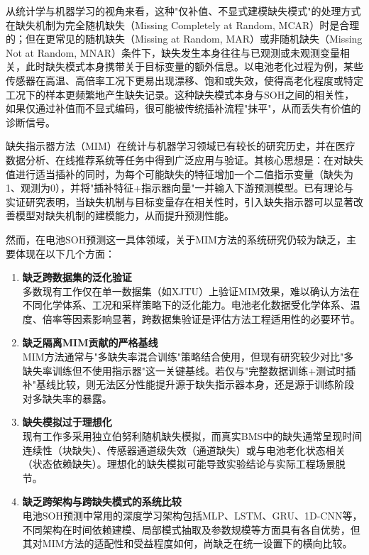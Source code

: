 \documentclass[10pt,a4paper]{ctexart}
\begin{document}
从统计学与机器学习的视角来看，这种"仅补值、不显式建模缺失模式"的处理方式在缺失机制为完全随机缺失（Missing Completely at Random, MCAR）时是合理的；但在更常见的随机缺失（Missing at Random, MAR）或非随机缺失（Missing Not at Random, MNAR）条件下，缺失发生本身往往与已观测或未观测变量相关，此时缺失模式本身携带关于目标变量的额外信息。以电池老化过程为例，某些传感器在高温、高倍率工况下更易出现漂移、饱和或失效，使得高老化程度或特定工况下的样本更频繁地产生缺失记录。这种缺失模式本身与SOH之间的相关性，如果仅通过补值而不显式编码，很可能被传统插补流程"抹平"，从而丢失有价值的诊断信号。

缺失指示器方法（MIM）在统计与机器学习领域已有较长的研究历史，并在医疗数据分析、在线推荐系统等任务中得到广泛应用与验证\cite{jones1996indicator,van2023missing}。其核心思想是：在对缺失值进行适当插补的同时，为每个可能缺失的特征增加一个二值指示变量（缺失为1、观测为0），并将"插补特征+指示器向量"一并输入下游预测模型。已有理论与实证研究表明，当缺失机制与目标变量存在相关性时，引入缺失指示器可以显著改善模型对缺失机制的建模能力，从而提升预测性能\cite{sisk2023imputation,ehrig2025imputation}。

然而，在电池SOH预测这一具体领域，关于MIM方法的系统研究仍较为缺乏，主要体现在以下几个方面：

\begin{enumerate}[label=(\arabic*)]
    \item \textbf{缺乏跨数据集的泛化验证}\\
    多数现有工作仅在单一数据集（如XJTU）上验证MIM效果，难以确认方法在不同化学体系、工况和采样策略下的泛化能力。电池老化数据受化学体系、温度、倍率等因素影响显著，跨数据集验证是评估方法工程适用性的必要环节。
    
    \item \textbf{缺乏隔离MIM贡献的严格基线}\\
    MIM方法通常与"多缺失率混合训练"策略结合使用，但现有研究较少对比"多缺失率训练但不使用指示器"这一关键基线。若仅与"完整数据训练+测试时插补"基线比较，则无法区分性能提升源于缺失指示器本身，还是源于训练阶段对多缺失率的暴露。
    
    \item \textbf{缺失模拟过于理想化}\\
    现有工作多采用独立伯努利随机缺失模拟，而真实BMS中的缺失通常呈现时间连续性（块缺失）、传感器通道级失效（通道缺失）或与电池老化状态相关（状态依赖缺失）。理想化的缺失模拟可能导致实验结论与实际工程场景脱节。
    
    \item \textbf{缺乏跨架构与跨缺失模式的系统比较}\\
    电池SOH预测中常用的深度学习架构包括MLP、LSTM、GRU、1D-CNN等，不同架构在时间依赖建模、局部模式抽取及参数规模等方面具有各自优势，但其对MIM方法的适配性和受益程度如何，尚缺乏在统一设置下的横向比较。
\end{enumerate}
\end{document}
